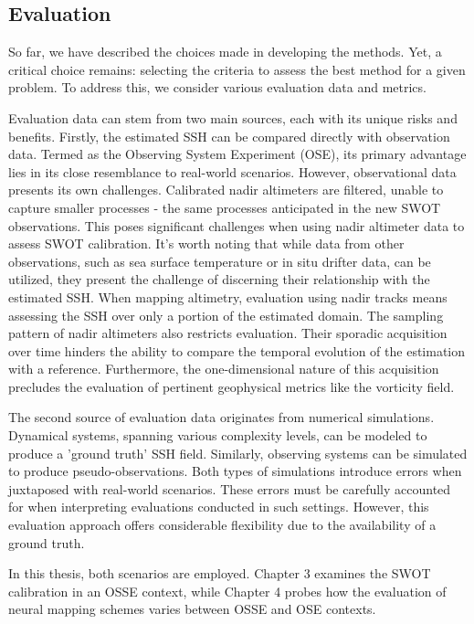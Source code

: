 \begin{bibunit}
\section{Evaluation}
  \label{c2sec:eval}
So far, we have described the choices made in developing the methods. Yet, a critical choice remains: selecting the criteria to assess the best method for a given problem. To address this, we consider various evaluation data and metrics.

Evaluation data can stem from two main sources, each with its unique risks and benefits. Firstly, the estimated SSH can be compared directly with observation data. Termed as the Observing System Experiment (OSE), its primary advantage lies in its close resemblance to real-world scenarios. However, observational data presents its own challenges. Calibrated nadir altimeters are filtered, unable to capture smaller processes - the same processes anticipated in the new SWOT observations. This poses significant challenges when using nadir altimeter data to assess SWOT calibration. It's worth noting that while data from other observations, such as sea surface temperature or in situ drifter data, can be utilized, they present the challenge of discerning their relationship with the estimated SSH. When mapping altimetry, evaluation using nadir tracks means assessing the SSH over only a portion of the estimated domain. The sampling pattern of nadir altimeters also restricts evaluation. Their sporadic acquisition over time hinders the ability to compare the temporal evolution of the estimation with a reference. Furthermore, the one-dimensional nature of this acquisition precludes the evaluation of pertinent geophysical metrics like the vorticity field.

The second source of evaluation data originates from numerical simulations. Dynamical systems, spanning various complexity levels, can be modeled to produce a 'ground truth' SSH field. Similarly, observing systems can be simulated to produce pseudo-observations. Both types of simulations introduce errors when juxtaposed with real-world scenarios. These errors must be carefully accounted for when interpreting evaluations conducted in such settings. However, this evaluation approach offers considerable flexibility due to the availability of a ground truth.

In this thesis, both scenarios are employed. Chapter 3 examines the SWOT calibration in an OSSE context, while Chapter 4 probes how the evaluation of neural mapping schemes varies between OSSE and OSE contexts.


\end{bibunit}
